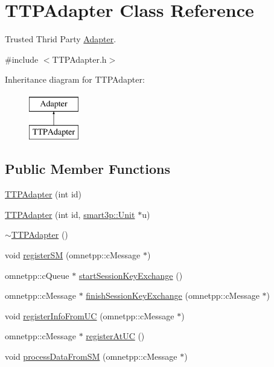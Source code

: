 \hypertarget{classTTPAdapter}{}\section{T\+T\+P\+Adapter Class Reference}
\label{classTTPAdapter}


Trusted Thrid Party \hyperlink{classAdapter}{Adapter}.  




{\ttfamily \#include $<$T\+T\+P\+Adapter.\+h$>$}

Inheritance diagram for T\+T\+P\+Adapter\+:\begin{figure}[H]
\begin{center}
\leavevmode
\includegraphics[height=2.000000cm]{classTTPAdapter}
\end{center}
\end{figure}
\subsection*{Public Member Functions}
\begin{DoxyCompactItemize}
\item 
\hyperlink{classTTPAdapter_a47fcddf78f8e0b494fe2f6a79f16c762}{T\+T\+P\+Adapter} (int id)
\item 
\hyperlink{classTTPAdapter_a2c64e6c544cf9aa5e715ecb91bae2baa}{T\+T\+P\+Adapter} (int id, \hyperlink{classsmart3p_1_1Unit}{smart3p\+::\+Unit} $\ast$u)
\item 
\hyperlink{classTTPAdapter_aac9a02ae55c0ba9752869e5c7f1a3d79}{$\sim$\+T\+T\+P\+Adapter} ()
\item 
void \hyperlink{classTTPAdapter_ad53a31939a278d3c114f79bea64f81f0}{register\+SM} (omnetpp\+::c\+Message $\ast$)
\item 
omnetpp\+::c\+Queue $\ast$ \hyperlink{classTTPAdapter_a1e5405c3ac74693b2a542dd72ad44012}{start\+Session\+Key\+Exchange} ()
\item 
omnetpp\+::c\+Message $\ast$ \hyperlink{classTTPAdapter_a3cfb4c68f5a6bf562584f7710b411e4a}{finish\+Session\+Key\+Exchange} (omnetpp\+::c\+Message $\ast$)
\item 
void \hyperlink{classTTPAdapter_a9aa8948a5224e2cf567eaacb2dcee6ab}{register\+Info\+From\+UC} (omnetpp\+::c\+Message $\ast$)
\item 
omnetpp\+::c\+Message $\ast$ \hyperlink{classTTPAdapter_a4eba454018be25436474c37ae1bbe083}{register\+At\+UC} ()
\item 
void \hyperlink{classTTPAdapter_ab69604de63c3f769a10ec33168611274}{process\+Data\+From\+SM} (omnetpp\+::c\+Message $\ast$)
\end{DoxyCompactItemize}
